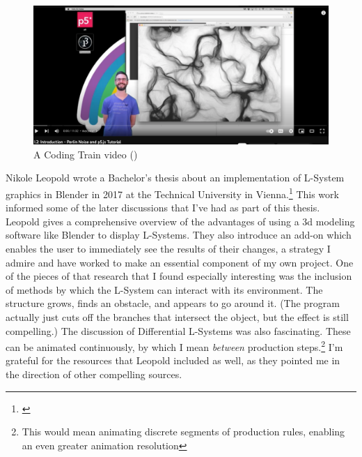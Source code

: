 \documentclass[12pt,twoside]{reedthesis}
\begin{document}
	
	\begin{figure}[H]
	\centering
	\includegraphics[width=\linewidth]{Images/CodingTrain}
	\caption{A Coding Train video (\cite{codingTrain})}
	\label{CodingTrain}
	\end{figure}
	
	Nikole Leopold wrote a Bachelor's thesis about an implementation of L-System graphics in Blender in 2017 at the Technical University in Vienna.\footnote{\cite{Leopold2017}} This work informed some of the later discussions that I've had as part of this thesis. Leopold gives a comprehensive overview of the advantages of using a 3d modeling software like Blender to display L-Systems. They also introduce an add-on which enables the user to immediately see the results of their changes, a strategy I admire and have worked to make an essential component of my own project. One of the pieces of that research that I found especially interesting was the inclusion of methods by which the L-System can interact with its environment. The structure grows, finds an obstacle, and appears to go around it. (The program actually just cuts off the branches that intersect the object, but the effect is still compelling.) The discussion of Differential L-Systems was also fascinating. These can be animated continuously, by which I mean \textit{between} production steps.\footnote{This would mean animating discrete segments of production rules, enabling an even greater animation resolution} I'm grateful for the resources that Leopold included as well, as they pointed me in the direction of other compelling sources.
	
\end{document}
